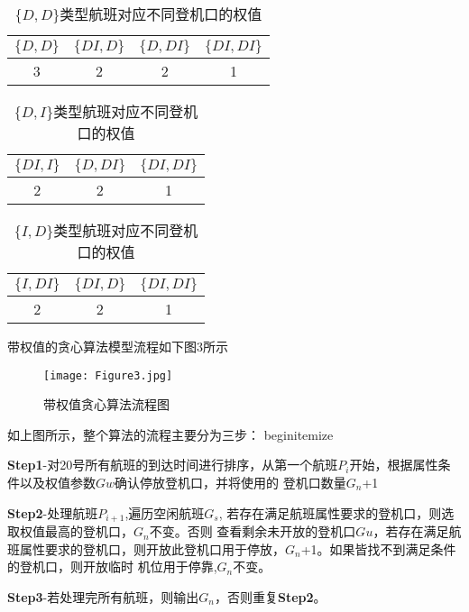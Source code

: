 \documentclass[bwprint]{gmcmthesis}
\begin{document}
\begin{table*}[!hbp]
    \centering
    \caption{$\{D, D\}$类型航班对应不同登机口的权值}
    \begin{tabular}{|c|c|c|c|}
        \hline  
        $\{D, D\}$ & $\{DI, D\}$ & $\{D, DI\}$ & $\{DI, DI\}$\\
        \hline 
        3&2&2&1\\
        \hline 
    \end{tabular}
\end{table*}
\begin{table*}[!hbp]
    \centering
    \caption{$\{D, I\}$类型航班对应不同登机口的权值}
    \begin{tabular}{|c|c|c|}
        \hline  
        $\{DI, I\}$ & $\{D, DI\}$ & $\{DI, DI\}$\\
        \hline 
        2&2&1\\
        \hline 
    \end{tabular}
\end{table*}

\begin{table*}[!hbp]
    \centering
    \caption{$\{I, D\}$类型航班对应不同登机口的权值}
    \begin{tabular}{|c|c|c|}
        \hline  
        $\{I, DI\}$ & $\{DI, D\}$ & $\{DI, DI\}$\\
        \hline 
        2&2&1\\
        \hline 
    \end{tabular}
\end{table*}

带权值的贪心算法模型流程如下图3所示
\begin{figure}[!h]
\centering
\texttt{[image: Figure3.jpg]}
\caption{带权值贪心算法流程图}
\end{figure}
如上图所示，整个算法的流程主要分为三步：
begin{itemize}
\item \textbf{Step1}-对20号所有航班的到达时间进行排序，从第一个航班$P_{i}$开始，根据属性条件以及权值参数$Gw$确认停放登机口，并将使用的
登机口数量$G_{n}$+1
\item \textbf{Step2}-处理航班$P_{i+1}$,遍历空闲航班$G_{s}$, 若存在满足航班属性要求的登机口，则选取权值最高的登机口，$G_{n}$不变。否则
查看剩余未开放的登机口$Gu$，若存在满足航班属性要求的登机口，则开放此登机口用于停放，$G_{n}$+1。如果皆找不到满足条件的登机口，则开放临时
机位用于停靠,$G_{n}$不变。
\item \textbf{Step3}-若处理完所有航班，则输出$G_{n}$，否则重复\textbf{Step2}。
\end{document}
